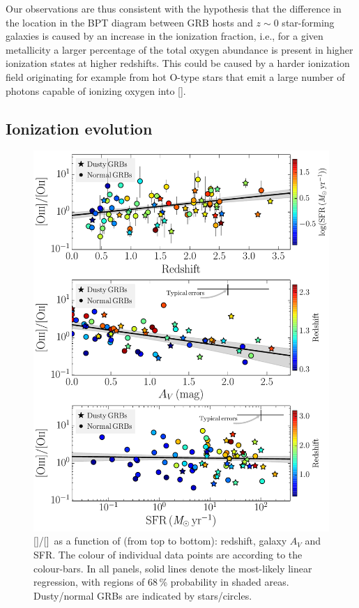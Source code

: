 \documentclass[traditabstract, longauth]{aa}
\newcommand{\oii}{[\ion{O}{ii}]}
\newcommand{\oiii}{[\ion{O}{iii}]}
\begin{document}
 {Our observations are thus consistent with the hypothesis} that the difference in the location in the BPT diagram between GRB hosts and $z\sim0$ star-forming galaxies is caused by an increase in the ionization fraction, i.e., for a given metallicity a larger percentage of the total oxygen abundance is present in higher ionization states at higher redshifts. This could be caused by a harder ionization field originating for example from hot O-type stars \citep{2014ApJ...795..165S} that emit a large number of photons capable of ionizing oxygen into \oiii. 



\subsection{Ionization evolution}

\begin{figure}
\includegraphics[angle=0, width=0.99\columnwidth]{Figs/OIIOIII.pdf}
\caption{\oiii/\oii\, as a function of (from top to bottom): redshift, galaxy $A_V$ and SFR. The colour of individual data points are according to the colour-bars. In all panels, solid lines denote the most-likely linear regression, with regions of 68\,\% probability in shaded areas. Dusty/normal GRBs are indicated by stars/circles.}
\label{fig:ionization}
\end{figure}
\end{document}

